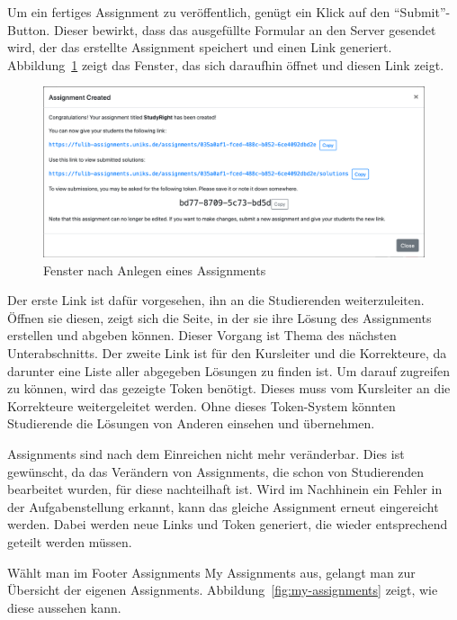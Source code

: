 Um ein fertiges Assignment zu veröffentlich, genügt ein Klick auf den ``Submit''-Button.
Dieser bewirkt, dass das ausgefüllte Formular an den Server gesendet wird, der das erstellte Assignment speichert und einen Link generiert.
Abbildung~\ref{fig:create-assignment-success} zeigt das Fenster, das sich daraufhin öffnet und diesen Link zeigt.

\begin{figure}
    \centering
    \includegraphics[width=\textwidth]{chapter/fulib.org/img/create-assignment-success.png}
    \caption{Fenster nach Anlegen eines Assignments}
    \label{fig:create-assignment-success}
\end{figure}

Der erste Link ist dafür vorgesehen, ihn an die Studierenden weiterzuleiten.
Öffnen sie diesen, zeigt sich die Seite, in der sie ihre Lösung des Assignments erstellen und abgeben können.
Dieser Vorgang ist Thema des nächsten Unterabschnitts.
Der zweite Link ist für den Kursleiter und die Korrekteure, da darunter eine Liste aller abgegeben Lösungen zu finden ist.
Um darauf zugreifen zu können, wird das gezeigte Token benötigt.
Dieses muss vom Kursleiter an die Korrekteure weitergeleitet werden.
Ohne dieses Token-System könnten Studierende die Lösungen von Anderen einsehen und übernehmen.

Assignments sind nach dem Einreichen nicht mehr veränderbar.
Dies ist gewünscht, da das Verändern von Assignments, die schon von Studierenden bearbeitet wurden, für diese nachteilhaft ist.
Wird im Nachhinein ein Fehler in der Aufgabenstellung erkannt, kann das gleiche Assignment erneut eingereicht werden.
Dabei werden neue Links und Token generiert, die wieder entsprechend geteilt werden müssen.

Wählt man im Footer Assignments \textrightarrow{} My Assignments aus, gelangt man zur Übersicht der eigenen Assignments.
Abbildung~\ref{fig:my-assignments} zeigt, wie diese aussehen kann. %


